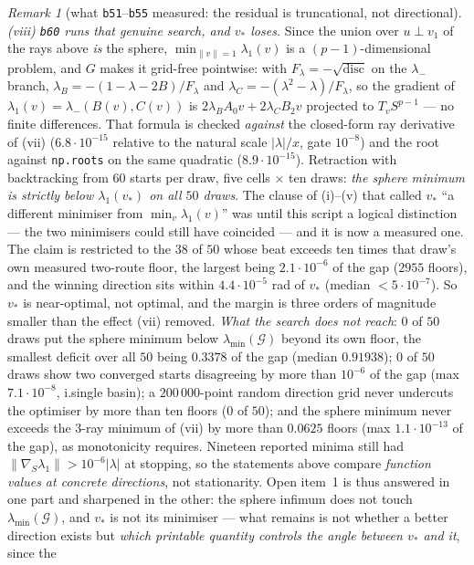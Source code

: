 \documentclass[11pt]{article}
\theoremstyle{remark}
\newtheorem{remark}{Remark}[section]
\newcommand{\Gr}{\mathcal{G}}
\begin{document}
\begin{remark}[what \texttt{b51}--\texttt{b55} measured: the residual is truncational, not directional]
\emph{(viii) \texttt{b60} runs that genuine search, and $v_\ast$ loses.} Since the union over $u\perp v_1$
of the rays above \emph{is} the sphere, $\min_{\|v\|=1}\lambda_1(v)$ is a $(p{-}1)$-dimensional problem,
and $G$ makes it grid-free pointwise: with $F_\lambda=-\sqrt{\operatorname{disc}}$ on the $\lambda_-$
branch, $\lambda_B=-(1-\lambda-2B)/F_\lambda$ and $\lambda_C=-(\lambda^2-\lambda)/F_\lambda$, so the
gradient of $\lambda_1(v)=\lambda_-(B(v),C(v))$ is $2\lambda_B A_0v+2\lambda_C B_2v$ projected to
$T_vS^{p-1}$ --- no finite differences. That formula is checked \emph{against} the closed-form ray
derivative of (vii) ($6.8\cdot10^{-15}$ relative to the natural scale $|\lambda|/x$, gate $10^{-8}$) and
the root against \texttt{np.roots} on the same quadratic ($8.9\cdot10^{-15}$). Retraction with
backtracking from $60$ starts per draw, five cells $\times$ ten draws:
\emph{the sphere minimum is strictly below $\lambda_1(v_\ast)$ on all $50$ draws}. The clause of (i)--(v)
that called $v_\ast$ ``a different minimiser from $\min_v\lambda_1(v)$'' was until this script a logical
distinction --- the two minimisers could still have coincided --- and it is now a measured one. The claim
is restricted to the $38$ of $50$
whose beat exceeds ten times that draw's own measured two-route floor, the largest being
$2.1\cdot10^{-6}$ of the gap ($2955$ floors), and the winning direction sits within
$4.4\cdot10^{-5}$ rad of $v_\ast$ (median $<5\cdot10^{-7}$). So $v_\ast$ is near-optimal, not optimal, and
the margin is three orders of magnitude smaller than the effect (vii) removed.
\emph{What the search does not reach}: $0$ of $50$ draws put the sphere minimum below
$\lambda_{\min}(\Gr)$ beyond its own floor, the smallest deficit over all $50$ being $0.3378$ of the gap
(median $0.91938$); $0$ of $50$ draws show two converged starts disagreeing by more than $10^{-6}$ of the
gap (max $7.1\cdot10^{-8}$, i.\@ single basin); a $200\,000$-point random direction grid never undercuts
the optimiser by more than ten floors ($0$ of $50$); and the sphere minimum never exceeds the $3$-ray
minimum of (vii) by more than $0.0625$ floors (max $1.1\cdot10^{-13}$ of the gap), as monotonicity
requires. Nineteen reported minima still had $\|\nabla_S\lambda_1\|>10^{-6}|\lambda|$ at stopping, so the
statements above compare \emph{function values at concrete directions}, not stationarity. Open item~1 is
thus answered in one part and sharpened in the other: the sphere infimum does not touch
$\lambda_{\min}(\Gr)$, and $v_\ast$ is not its minimiser --- what remains is not whether a better
direction exists but \emph{which printable quantity controls the angle between $v_\ast$ and it}, since the

\end{remark}
\end{document}
